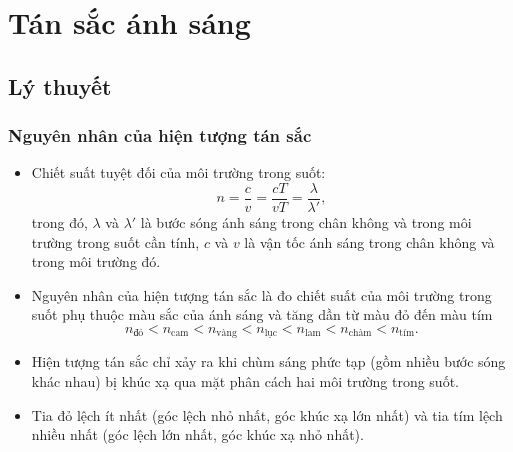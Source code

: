 
\chapter[Tán sắc ánh sáng]{Tán sắc ánh sáng}

\section{Lý thuyết}

\subsection{Nguyên nhân của hiện tượng tán sắc}
\begin{itemize}
	\item Chiết suất tuyệt đối của môi trường trong suốt: 
	\begin{equation}\label{eq:tansac1}
		n=\dfrac{c}{v}= \dfrac{cT}{vT}=\dfrac{\lambda}{\lambda'},
	\end{equation}
	trong đó, $\lambda$ và  $\lambda'$ là bước sóng ánh sáng trong chân không và trong môi trường trong suốt cần tính, $c$ và $v$ là vận tốc ánh sáng trong chân không và trong môi trường đó.
	
	\item Nguyên nhân của hiện tượng tán sắc là đo chiết suất của môi trường trong suốt phụ thuộc màu sắc của ánh sáng và tăng dần từ màu đỏ đến màu tím 
	\begin{equation}\label{eq:tansac2}
		n_\text{đỏ} < n_\text{cam} <n_\text{vàng} < n_\text{lục} <n_\text{lam} < n_\text{chàm} < n_\text{tím}.
	\end{equation}
	\item Hiện tượng tán sắc chỉ xảy ra khi chùm sáng phức tạp (gồm nhiều bước sóng khác nhau) bị khúc xạ qua mặt phân cách hai môi trường trong suốt.
	\item Tia đỏ lệch ít nhất (góc lệch nhỏ nhất, góc khúc xạ lớn nhất) và tia tím lệch nhiều nhất (góc lệch lớn nhất, góc khúc xạ nhỏ nhất).
\end{itemize}


